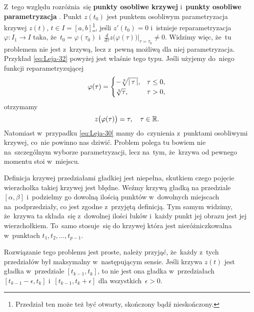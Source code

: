 \documentclass[a4paper,11pt]{article}
\begin{document}
Z~tego względu rozróżnia~się \textbf{punkty osobliwe krzywej}
i~\textbf{punkty osobliwe parametryzacja}
\cite{GdowskiElementGeometriiRozniczkowejZZadaniami1999}. Punkt
$z( t_{ 0 } )$ jest punktem osobliwym parametryzacja krzywej $z( t )$,
$t \in I = [ a, b ]$\footnote{Przedział ten może też być otwarty,
  skończony bądź nieskończony.}, jeśli $z'( t_{ 0 } ) = 0$ i~istnieje
reparametryzacja $\varphi: I_{ 1 } \to I$ taka,
że~$t_{ 0 } = \varphi( \tau_{ 0 } )$
i~$\tfrac{ d }{ d \tau } z\big( \varphi( \tau ) \big)|_{ \tau = \tau_{
    0 } } \neq 0$. Widzimy więc, że~tu problemem nie jest z~krzywą,
lecz z~pewną możliwą dla niej parametryzacja. Przykład
\eqref{eq:Leja-32} powyżej jest właśnie tego typu. Jeśli użyjemy
do~niego funkcji reparametryzującej
\begin{equation}
  \label{eq:Leja-Funkcje-zespolone-33}
  \varphi( \tau ) =
  \begin{cases}
    -\sqrt[3]{ |\, {  \tau  } \,| }, & \tau \leq 0, \\
    \sqrt[3]{ \tau }, & \tau > 0,
  \end{cases}
\end{equation}
otrzymamy
\begin{equation}
  \label{eq:Leja-Funkcje-zespolone-34}
  z\big( \varphi( \tau ) \big) = \tau, \quad \tau \in \mathbb{R}.
\end{equation}
Natomiast w~przypadku \eqref{eq:Leja-30} mamy do~czynienia z~punktami
osobliwymi krzywej, co~nie powinno nas dziwić. Problem polega tu
bowiem nie na~szczególnym wyborze parametryzacji, lecz na~tym,
że~krzywa od pewnego momentu stoi w~miejscu.

\vspace{\spaceFour}





\noindent
{} Definicja krzywej przedziałami gładkiej jest niepełna,
skutkiem czego pojęcie wierzchołka takiej krzywej jest błędne. Weźmy
krzywą gładką na przedziale $[ \alpha, \beta ]$ i~podzielmy go dowolną ilością
punktów w~dowolnych miejscach na~podprzedziały, co jest zgodne z~przyjętą
definicją. Tym samym widzimy, że~krzywa ta składa~się z~dowolnej ilości
łuków i~każdy punkt jej obrazu jest jej wierzchołkiem. To~samo stosuje~się
do krzywej która jest nieróżniczkowalna w~punktach
$t_{ 1 }, t_{ 2 }, \ldots, t_{ p - 1 }$.

Rozwiązanie tego problemu jest proste, należy przyjąć, że~każdy z~tych
przedziałów był maksymalny w~następującym sensie. Jeśli krzywa
$z( t )$ jest gładka w~przedziale $[ t_{ k - 1 }, t_{ k } ]$, to nie
jest ona gładka w~przedziałach $[ t_{ k - 1 } - \epsilon, t_{ k } ]$
i~$[ t_{ k - 1 }, t_{ k } + \epsilon ]$ dla wszystkich~$\epsilon > 0$.
\end{document}
